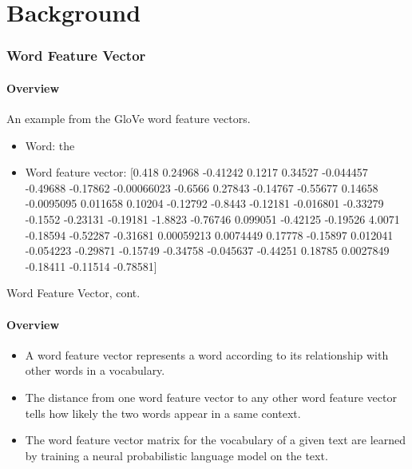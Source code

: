 \documentclass{beamer}
\begin{document}
\section{Background}

\begin{frame} \frametitle{Word Feature Vector}\framesubtitle{Overview}
  \begin{examples}
  An example from the GloVe word feature vectors.
    \begin{itemize}
        \item Word: the
        \item Word feature vector: [0.418 0.24968 -0.41242 0.1217 0.34527 -0.044457 -0.49688 -0.17862 -0.00066023 -0.6566 0.27843 -0.14767 -0.55677 0.14658 -0.0095095 0.011658 0.10204 -0.12792 -0.8443 -0.12181 -0.016801 -0.33279 -0.1552 -0.23131 -0.19181 -1.8823 -0.76746 0.099051 -0.42125 -0.19526 4.0071 -0.18594 -0.52287 -0.31681 0.00059213 0.0074449 0.17778 -0.15897 0.012041 -0.054223 -0.29871 -0.15749 -0.34758 -0.045637 -0.44251 0.18785 0.0027849 -0.18411 -0.11514 -0.78581]
    \end{itemize}
  \end{examples}
\end{frame}

\begin{frame}{Word Feature Vector, cont.}\framesubtitle{Overview}
\begin{itemize}
      \item A word feature vector represents a word according to its relationship with other words in a vocabulary.
      \item The distance from one word feature vector to any other word feature vector tells how likely the two words appear in a same context.
      \item The word feature vector matrix for the vocabulary of a given text are learned by training a neural probabilistic language model on the text.
  \end{itemize}
\end{frame}
\end{document}
